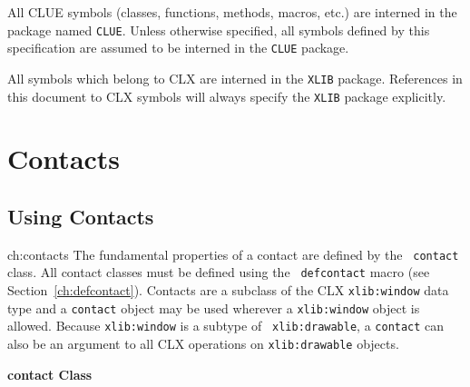 \documentclass[twoside]{book}
\begin{document}
\begin{sloppy}
  All CLUE symbols (classes,
functions, methods, macros, etc.) are interned in the package named
{\tt CLUE}. Unless otherwise specified, all symbols defined by this
specification are assumed to be interned in the {\tt CLUE} package.

  All symbols which belong
to CLX are interned in the {\tt XLIB} package.  References in this
document to CLX symbols will always specify the {\tt XLIB} package
explicitly.


\chapter{Contacts}

\section{Using Contacts}{ch:contacts}
The fundamental properties of a contact are defined by the {\tt
  contact} class.  All contact classes must be defined using the {\tt
  defcontact} macro (see Section~\ref{ch:defcontact}).  Contacts are a
subclass of the CLX {\tt xlib:window}  data type and a
{\tt contact} object may be used wherever a {\tt xlib:window} object
is allowed. Because {\tt xlib:window} is a subtype of {\tt
  xlib:drawable}, a {\tt contact} can also be an argument to all CLX
operations on {\tt xlib:drawable} objects. 

{\large {\bf contact \hfill Class}}


\end{sloppy}
\end{document}
